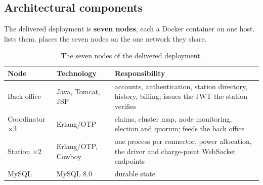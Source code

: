 \subsection{Architectural components}
\label{sec:components}

The delivered deployment is \textbf{seven nodes}, each a Docker container on one host.
 lists them.
 places the seven nodes on the one network they share.

\begin{table}[t]
\centering\small
\renewcommand{\arraystretch}{1.2}
\caption{The seven nodes of the delivered deployment.}
\label{tab:nodes}
\begin{tabularx}{\textwidth}{@{}>{\raggedright\arraybackslash}p{3.1cm}
                               >{\raggedright\arraybackslash}p{3.4cm} X@{}}
\toprule
Node & Technology & Responsibility \\
\midrule
Back office & Java, Tomcat, JSP & accounts, authentication, station directory, history,
  billing; issues the JWT the station verifies \\
Coordinator $\times$3 & Erlang/OTP & claims, cluster map, node monitoring, election and
  quorum; feeds the back office \\
Station $\times$2 & Erlang/OTP, Cowboy & one process per connector, power allocation, the
  driver and charge-point WebSocket endpoints \\
MySQL & MySQL 8.0 & durable state \\
\bottomrule
\end{tabularx}
\end{table}

